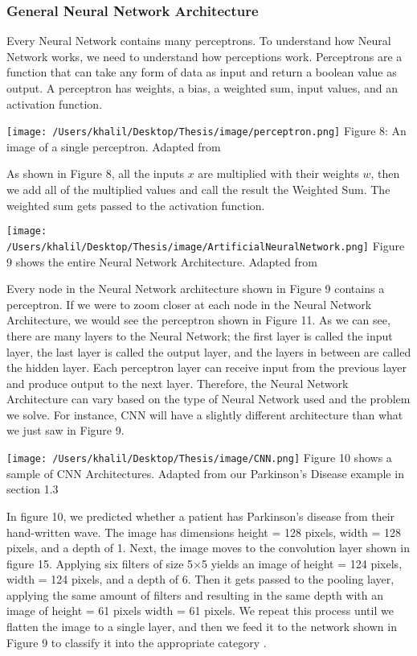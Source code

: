\documentclass[oneside,12pt,article]{article}
\begin{document}
\subsubsection{General Neural Network Architecture}
Every Neural Network contains many perceptrons. To understand how Neural Network works, we need to understand how perceptions work. Perceptrons are a function that can take any form of data as input and return a boolean value as output. A perceptron has weights, a bias, a weighted sum, input values, and an activation function.  

\begin{center}
\texttt{[image: /Users/khalil/Desktop/Thesis/image/perceptron.png]}
Figure 8: An image of a single perceptron. Adapted from \cite{gankidi2017fpga}
\end{center}
As shown in Figure 8, all the inputs $x$ are multiplied with their weights $w$, then we add all of the multiplied values and call the result the Weighted Sum. The weighted sum gets passed to the activation function. 
\newline
\newline
\begin{center}
\texttt{[image: /Users/khalil/Desktop/Thesis/image/ArtificialNeuralNetwork.png]}
Figure 9 shows the entire Neural Network Architecture. Adapted from \cite{gankidi2017fpga}

\end{center}
Every node in the Neural Network architecture shown in Figure 9 contains a perceptron. If we were to zoom closer at each node in the Neural Network Architecture, we would see the perceptron shown in Figure 11.    
As we can see, there are many layers to the Neural Network; the first layer is called the input layer, the last layer is called the output layer, and the layers in between are called the hidden layer. Each perceptron layer can receive input from the previous layer and produce output to the next layer. Therefore, the Neural Network Architecture can vary based on the type of Neural Network used and the problem we solve. For instance, CNN will have a slightly different architecture than what we just saw in Figure 9. 


\begin{center}
\texttt{[image: /Users/khalil/Desktop/Thesis/image/CNN.png]}
Figure 10 shows a sample of CNN Architectures. Adapted from our Parkinson's Disease example in section 1.3  

\end{center}
In figure 10, we predicted whether a patient has Parkinson's disease from their hand-written wave. The image has dimensions height = 128 pixels, width = 128 pixels, and a depth of 1. Next, the image moves to the convolution layer shown in figure 15. Applying six filters of size 5$\times$5 yields an image of height = 124 pixels, width = 124 pixels, and a depth of 6. Then it gets passed to the pooling layer, applying the same amount of filters and resulting in the same depth with an image of height = 61 pixels width = 61 pixels. We repeat this process until we flatten the image to a single layer, and then we feed it to the network shown in Figure 9 to classify it into the appropriate category \cite{al2017review}.
\end{document}
